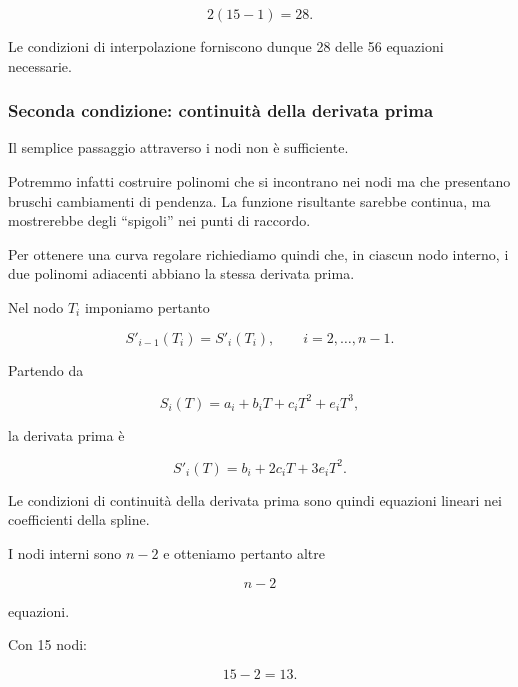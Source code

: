 \begin{equation*}
    2(15-1)=28.
\end{equation*}

Le condizioni di interpolazione forniscono dunque 28 delle 56
equazioni necessarie.


\subsubsection{Seconda condizione: continuità della derivata prima}

Il semplice passaggio attraverso i nodi non è sufficiente.

Potremmo infatti costruire polinomi che si incontrano nei nodi ma che
presentano bruschi cambiamenti di pendenza. La funzione risultante
sarebbe continua, ma mostrerebbe degli ``spigoli'' nei punti di
raccordo.

Per ottenere una curva regolare richiediamo quindi che, in ciascun
nodo interno, i due polinomi adiacenti abbiano la stessa derivata
prima.

Nel nodo $T_i$ imponiamo pertanto

\begin{equation*}
    S'_{i-1}(T_i)=S'_i(T_i),
    \qquad i=2,\ldots,n-1.
    \label{eq:spline-first-derivative}
\end{equation*}

Partendo da

\begin{equation*}
    S_i(T)=a_i+b_iT+c_iT^2+e_iT^3,
\end{equation*}

la derivata prima è

\begin{equation*}
    S'_i(T)
    =
    b_i+2c_iT+3e_iT^2.
\end{equation*}

Le condizioni di continuità della derivata prima sono quindi
equazioni lineari nei coefficienti della spline.

I nodi interni sono $n-2$ e otteniamo pertanto altre

\begin{equation*}
    n-2
\end{equation*}

equazioni.

Con 15 nodi:

\begin{equation*}
    15-2=13.
\end{equation*}

